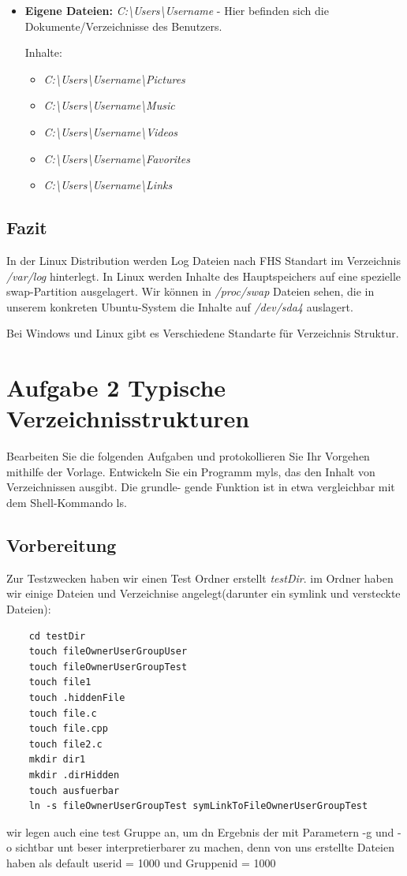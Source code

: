 \begin{itemize}
\begin{itemize}
\item 	\textbf{Eigene Dateien:} 	\textit{C:\textbackslash Users\textbackslash Username} -
Hier befinden sich die Dokumente/Verzeichnisse des Benutzers.

Inhalte:
	\begin{itemize}
	\item \textit{C:\textbackslash Users\textbackslash Username\textbackslash Pictures}
	\item \textit{C:\textbackslash Users\textbackslash Username\textbackslash Music}
	\item \textit{C:\textbackslash Users\textbackslash Username\textbackslash Videos}
	\item \textit{C:\textbackslash Users\textbackslash Username\textbackslash Favorites}
	\item \textit{C:\textbackslash Users\textbackslash Username\textbackslash Links}
	\end{itemize}
\end{itemize}
	\end{itemize}

	\subsection{Fazit}
	In der Linux Distribution werden Log Dateien nach FHS Standart im Verzeichnis \textit{/var/log} hinterlegt.
	In Linux werden Inhalte des Hauptspeichers auf eine spezielle swap-Partition ausgelagert. Wir können in
	\textit{/proc/swap} Dateien sehen, die in unserem konkreten Ubuntu-System die Inhalte auf \textit{/dev/sda4} auslagert.

	Bei Windows und Linux gibt es Verschiedene Standarte für Verzeichnis Struktur.

\newpage
\section{Aufgabe 2 Typische Verzeichnisstrukturen}
Bearbeiten Sie die folgenden Aufgaben und protokollieren Sie Ihr Vorgehen mithilfe der Vorlage.
Entwickeln Sie ein Programm myls, das den Inhalt von Verzeichnissen ausgibt. Die grundle-
gende Funktion ist in etwa vergleichbar mit dem Shell-Kommando ls.
\subsection{Vorbereitung}
Zur Testzwecken haben wir einen Test Ordner erstellt \textit{testDir}.
im Ordner haben wir einige Dateien und Verzeichnise angelegt(darunter ein symlink und versteckte Dateien):
\begin{lstlisting}
	cd testDir
	touch fileOwnerUserGroupUser
	touch fileOwnerUserGroupTest
 	touch file1
 	touch .hiddenFile
 	touch file.c
 	touch file.cpp
	touch file2.c
 	mkdir dir1
 	mkdir .dirHidden
	touch ausfuerbar
	ln -s fileOwnerUserGroupTest symLinkToFileOwnerUserGroupTest
\end{lstlisting}
wir legen auch eine test Gruppe an, um dn Ergebnis der  mit Parametern -g und -o
sichtbar unt beser interpretierbarer zu machen, denn von uns erstellte Dateien haben als default
userid = 1000 und Gruppenid = 1000


